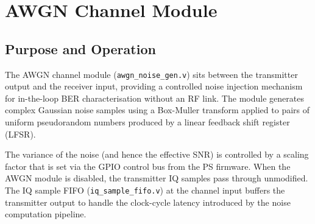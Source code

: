\documentclass[12pt, a4paper, oneside]{report}
\begin{document}
\section{AWGN Channel Module}

\subsection{Purpose and Operation}

The AWGN channel module (\texttt{awgn\_noise\_gen.v}) sits between the transmitter output and the receiver input, providing a controlled noise injection mechanism for in-the-loop BER characterisation without an RF link. The module generates complex Gaussian noise samples using a Box-Muller transform applied to pairs of uniform pseudorandom numbers produced by a linear feedback shift register (LFSR).

The variance of the noise (and hence the effective SNR) is controlled by a scaling factor that is set via the GPIO control bus from the PS firmware. When the AWGN module is disabled, the transmitter IQ samples pass through unmodified. The IQ sample FIFO (\texttt{iq\_sample\_fifo.v}) at the channel input buffers the transmitter output to handle the clock-cycle latency introduced by the noise computation pipeline.
\end{document}
